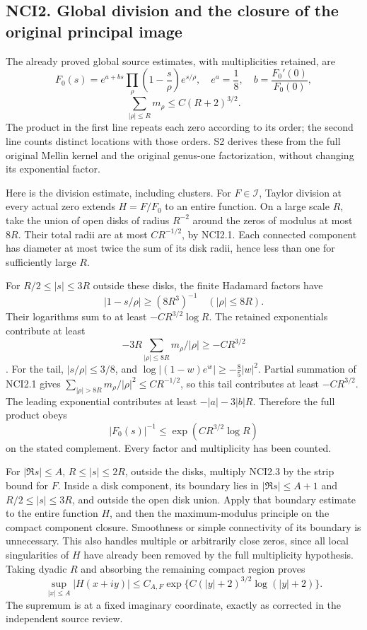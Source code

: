 \subsection{NCI2. Global division and the closure of the original
principal
image}\label{nci2.-global-division-and-the-closure-of-the-original-principal-image}

The already proved global source estimates, with multiplicities
retained, are \[
F_0(s)=e^{a+bs}\prod_\rho\left(1-\frac{s}{\rho}\right)e^{s/\rho},
\quad e^a=\frac18,\quad b=\frac{F_0'(0)}{F_0(0)},
\] \[
\sum_{|\rho|\le R}m_\rho\le C(R+2)^{3/2}.
\tag{NCI2.1}
\] The product in the first line repeats each zero according to its
order; the second line counts distinct locations with those orders. S2
derives these from the full original Mellin kernel and the original
genus-one factorization, without changing its exponential factor.

Here is the division estimate, including clusters. For
\(F\in\mathcal I\), Taylor division at every actual zero extends
\(H=F/F_0\) to an entire function. On a large scale \(R\), take the
union of open disks of radius \(R^{-2}\) around the zeros of modulus at
most \(8R\). Their total radii are at most \(CR^{-1/2}\), by NCI2.1.
Each connected component has diameter at most twice the sum of its disk
radii, hence less than one for sufficiently large \(R\).

For \(R/2\le|s|\le3R\) outside these disks, the finite Hadamard factors
have \[
|1-s/\rho|\ge(8R^3)^{-1}\quad(|\rho|\le8R).
\tag{NCI2.2}
\] Their logarithms sum to at least \(-CR^{3/2}\log R\). The retained
exponentials contribute at least \[
-3R\sum_{|\rho|\le8R}m_\rho/|\rho|\ge-CR^{3/2}
\]. For the tail, \(|s/\rho|\le3/8\), and
\(\log|(1-w)e^w|\ge-\frac85|w|^2\). Partial summation of NCI2.1 gives
\(\sum_{|\rho|>8R}m_\rho/|\rho|^2\le CR^{-1/2}\), so this tail
contributes at least \(-CR^{3/2}\). The leading exponential contributes
at least \(-|a|-3|b|R\). Therefore the full product obeys \[
|F_0(s)|^{-1}\le\exp(CR^{3/2}\log R)
\tag{NCI2.3}
\] on the stated complement. Every factor and multiplicity has been
counted.

For \(|\Re s|\le A\), \(R\le|s|\le2R\), outside the disks, multiply
NCI2.3 by the strip bound for \(F\). Inside a disk component, its
boundary lies in \(|\Re s|\le A+1\) and \(R/2\le|s|\le3R\), and outside
the open disk union. Apply that boundary estimate to the entire function
\(H\), and then the maximum-modulus principle on the compact component
closure. Smoothness or simple connectivity of its boundary is
unnecessary. This also handles multiple or arbitrarily close zeros,
since all local singularities of \(H\) have already been removed by the
full multiplicity hypothesis. Taking dyadic \(R\) and absorbing the
remaining compact region proves \[
\sup_{|x|\le A}|H(x+iy)|
\le C_{A,F}\exp\{C(|y|+2)^{3/2}\log(|y|+2)\}.
\tag{NCI2.4}
\] The supremum is at a fixed imaginary coordinate, exactly as corrected
in the independent source review.

